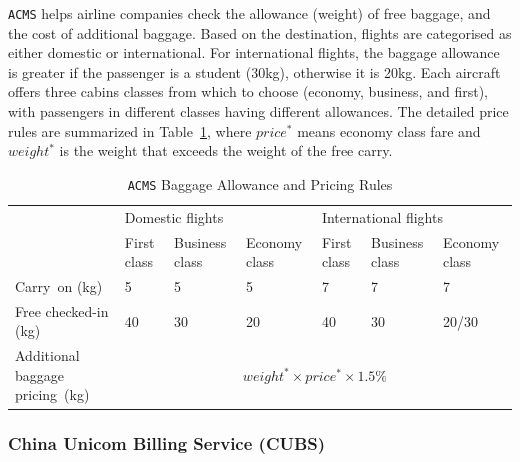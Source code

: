\documentclass[10pt,journal,compsoc]{IEEEtran}
\begin{document}
\texttt{ACMS} helps airline companies check the allowance (weight) of free baggage, and the cost of additional baggage.
Based on the destination, flights are categorised as either domestic or international.
For international flights, the baggage allowance is greater if the passenger is a student (30kg), otherwise it is 20kg.
Each aircraft offers three cabins classes from which to choose (economy, business, and first), with passengers in different classes having different allowances.
The detailed price rules are summarized in Table~\ref{tab:aviation}, where $price^*$ means economy class fare and $weight^*$ is the weight that exceeds the weight of the free carry.
\begin{table}
  \caption{\texttt{ACMS} Baggage Allowance and Pricing Rules}
  \label{tab:aviation}
  \centering
  \begin{tabular}{lllllll} \toprule
  \multirow{2}{*}{}     &\multicolumn{3}{l}{Domestic flights} &\multicolumn{3}{l}{International flights} \\ \cmidrule(lr){2-4} \cmidrule(lr){5-7}
                       &First class  &Business class   &Economy class   &First class  &Business class   &Economy class \\ \midrule
  Carry~on (kg)   &5       &5        &5        &7        &7        &7  \\
  Free checked-in (kg)   &40      &30       &20       &40       &30       &20/30 \\
  Additional baggage pricing~(kg)   &\multicolumn{6}{c}{$weight^* \times price^* \times 1.5\%$}     \\ \bottomrule
  \end{tabular}
\end{table}

\subsubsection{China Unicom Billing Service (CUBS)}
\label{sec:cubs}
\end{document}
